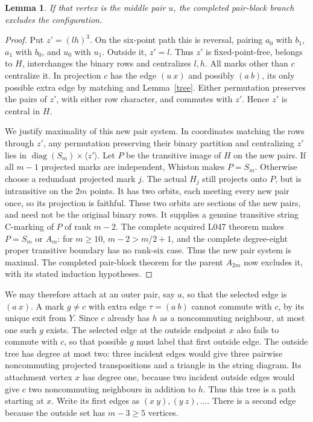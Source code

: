 \documentclass[11pt,a4paper]{article}
\newtheorem{lemma}{Lemma}
\newcommand{\gen}[1]{\langle#1\rangle}
\begin{document}
\begin{lemma}\label{centralpair}
If that vertex is the middle pair $u$, the completed pair-block
branch excludes the configuration.
\end{lemma}
\begin{proof}
Put $z'=(lh)^3$. On the six-point path this is reversal, pairing
$a_0$ with $b_1$, $a_1$ with $b_0$, and $u_0$ with $u_1$.
Outside it, $z'=l$. Thus $z'$ is fixed-point-free, belongs to $H$,
interchanges the binary rows and centralizes $l,h$. All marks other
than $c$ centralize it. In projection $c$ has the edge $(u\ x)$
and possibly $(a\ b)$, its only possible extra edge by matching
and Lemma~\ref{tree}. Either permutation preserves the pairs of
$z'$, with either row character, and commutes with $z'$. Hence
$z'$ is central in $H$.

We justify maximality of this new pair system. In coordinates
matching the rows through $z'$, any permutation preserving their
binary partition and centralizing $z'$ lies in
$\operatorname{diag}(S_m)\times\gen{z'}$. Let $P$ be the
transitive image of $H$ on the new pairs. If all $m-1$ projected
marks are independent, Whiston makes $P=S_m$. Otherwise choose a
redundant projected mark $j$. The actual $H_j$ still projects onto
$P$, but is intransitive on the $2m$ points. It has two orbits,
each meeting every new pair once, so its projection is faithful.
These two orbits are sections of the new pairs, and need not
be the original binary rows.
It supplies a genuine transitive string C-marking of $P$ of rank
$m-2$. The complete acquired L047 theorem makes $P=S_m$ or $A_m$:
for $m\ge10$, $m-2>m/2+1$, and the complete degree-eight proper
transitive boundary has no rank-six case. Thus the new pair system
is maximal. The completed pair-block theorem for the parent
$A_{2m}$ now excludes it, with its stated induction hypotheses.
\end{proof}

We may therefore attach at an outer pair, say $a$, so that the
selected edge is $(a\ x)$. A mark $g\ne c$ with extra edge
$\tau=(a\ b)$ cannot commute with $c$, by its unique exit from
$Y$. Since $c$ already has $h$ as a noncommuting neighbour, at most
one such $g$ exists. The selected edge at the outside endpoint $x$
also fails to commute with $c$, so that possible $g$ must label
that first outside edge. The outside tree has degree at most two:
three incident edges would give three pairwise noncommuting
projected transpositions and a triangle in the string diagram.
Its attachment vertex $x$ has degree one, because two incident
outside edges would give $c$ two noncommuting neighbours in
addition to $h$. Thus this tree is a path starting at $x$.
Write its first edges as $(x\ y),(y\ z),\ldots$. There is a
second edge because the outside set has $m-3\ge5$ vertices.
\end{document}
